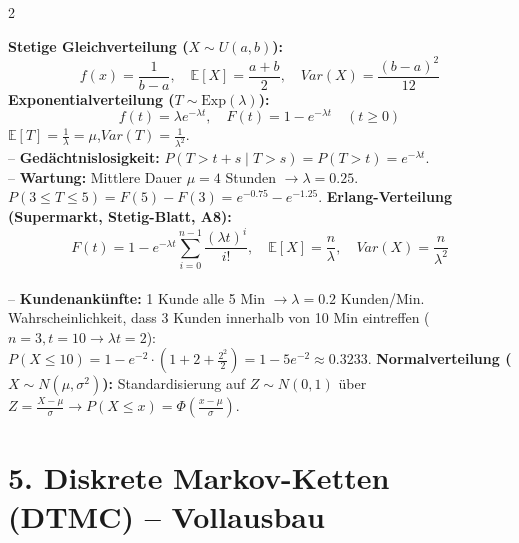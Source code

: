 \documentclass[a4paper, 9pt]{extarticle}
\begin{document}
\begin{multicols*}{2}
\begin{tcolorbox}[title={Stetige Modelle: Gleich, Exp, Erlang, Normal}, colframe=distred, colback=distred!5, colbacktitle=distred]
\textbf{Stetige Gleichverteilung ($X \sim U(a,b)$):}
$$f(x) = \frac{1}{b-a}, \quad \mathbb{E}[X] = \frac{a+b}{2}, \quad Var(X) = \frac{(b-a)^2}{12}$$
\textbf{Exponentialverteilung ($T \sim \text{Exp}(\lambda)$):}
$$f(t) = \lambda e^{-\lambda t}, \quad F(t) = 1 - e^{-\lambda t} \quad (t \ge 0)$$
$\mathbb{E}[T] = \frac{1}{\lambda} = \mu$,\quad $Var(T) = \frac{1}{\lambda^2}$.
\\-- \textbf{Gedächtnislosigkeit:} $P(T > t+s \mid T > s) = P(T > t) = e^{-\lambda t}$.
\\-- \textbf{Wartung:} Mittlere Dauer $\mu=4$ Stunden $\rightarrow \lambda = 0.25$.
\\$P(3 \le T \le 5) = F(5) - F(3) = e^{-0.75} - e^{-1.25}$.
\smallskip
\textbf{Erlang-Verteilung (Supermarkt, Stetig-Blatt, A8):}
$$F(t) = 1 - e^{-\lambda t} \sum_{i=0}^{n-1} \frac{\left(\lambda t\right)^i}{i!}, \quad \mathbb{E}[X] = \frac{n}{\lambda}, \quad Var(X) = \frac{n}{\lambda^2}$$
\\-- \textbf{Kundenankünfte:} 1 Kunde alle 5 Min $\rightarrow \lambda = 0.2$ Kunden/Min. Wahrscheinlichkeit, dass 3 Kunden innerhalb von 10 Min eintreffen ($n=3, t=10 \rightarrow \lambda t = 2$):
\\$P(X \le 10) = 1 - e^{-2} \cdot \left(1 + 2 + \frac{2^2}{2}\right) = 1 - 5e^{-2} \approx 0.3233$.
\smallskip
\textbf{Normalverteilung ($X \sim N(\mu, \sigma^2)$):} Standardisierung auf $Z \sim N(0,1)$ über $Z = \frac{X-\mu}{\sigma} \rightarrow P(X \le x) = \Phi\left(\frac{x-\mu}{\sigma}\right)$.
\end{tcolorbox}

\section*{5. Diskrete Markov-Ketten (DTMC) -- Vollausbau}


\end{multicols*}
\end{document}

